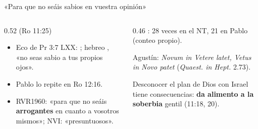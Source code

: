 \begin{frame}{«Para que no seáis sabios en vuestra opinión»}
\begin{columns}[T,onlytextwidth]
\begin{column}{0.52\textwidth}\scriptsize\RaggedRight
{} (Ro 11:25)\par\smallskip
\begin{itemize}
\item Eco de Pr 3:7 LXX: ; hebreo , «no seas sabio a tus propios ojos».
\item Pablo lo repite en Ro 12:16.
\item RVR1960: «para que no seáis \textbf{arrogantes} en cuanto a vosotros mismos»; NVI: «presuntuosos».
\end{itemize}
\end{column}
\begin{column}{0.46\textwidth}\scriptsize\RaggedRight
\textbf{\textcolor{cafe}{}}: 28 veces en el NT, 21 en Pablo (conteo propio).\par\smallskip
Agustín: \emph{Novum in Vetere latet, Vetus in Novo patet} (\emph{Quaest. in Hept.} 2.73).\par\medskip
\begin{tcolorbox}[colback=piedra,colframe=ladrillo,boxrule=0.8pt,arc=2pt,fontupper=\scriptsize]
Desconocer el plan de Dios con Israel tiene consecuencias: \textbf{da alimento a la soberbia} gentil (11:18, 20).
\end{tcolorbox}
\end{column}
\end{columns}
\end{frame}

